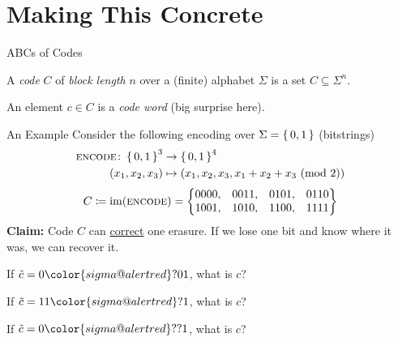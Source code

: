 \documentclass[aspectratio=169]{beamer}
\begin{document}
\section{Making This Concrete}
\frame{\sectionpage}

\begin{frame}{ABCs of Codes}
    \begin{defn}
        A \emph{code} $C$ of \emph{block length} $n$ over a (finite) alphabet $\Sigma$ is a set $C \subseteq \Sigma^n$.
        
        An element $c \in C$ is a \emph{code word} (big surprise here).
    \end{defn} 
\end{frame}

\begin{frame}{An Example}
    Consider the following encoding over $\Sigma = \set{0, 1}$ (bitstrings)
    \begin{align*}
        \textsc{encode}\colon \set{0, 1}^3 &\to \set{0, 1}^4 \\
                    (x_1, x_2, x_3) &\mapsto (x_1, x_2, x_3, x_1 + x_2 + x_3 \pmod{2})
    \end{align*} \pause
    \[
        C \coloneqq \operatorname{im}(\textsc{encode}) = \begin{Bmatrix}
                0000, & 0011, & 0101, & 0110 \\
                1001, & 1010, & 1100, & 1111
        \end{Bmatrix}
    \] \pause
    \textcolor{sigma@mainblue}{\textbf{Claim:}} Code $C$ can \ul{correct} one erasure.
    If we lose one bit and know where it was, we can recover it.\pause

    If $\tilde{c} =  0{\color{sigma@alertred}?}01$, what is $c$?  \pause
    
    If $\tilde{c} =  11{\color{sigma@alertred}?}1$, what is $c$?  \pause
    
    If $\tilde{c} =  0{\color{sigma@alertred}??}1$, what is $c$? 
\end{frame}
\end{document}

